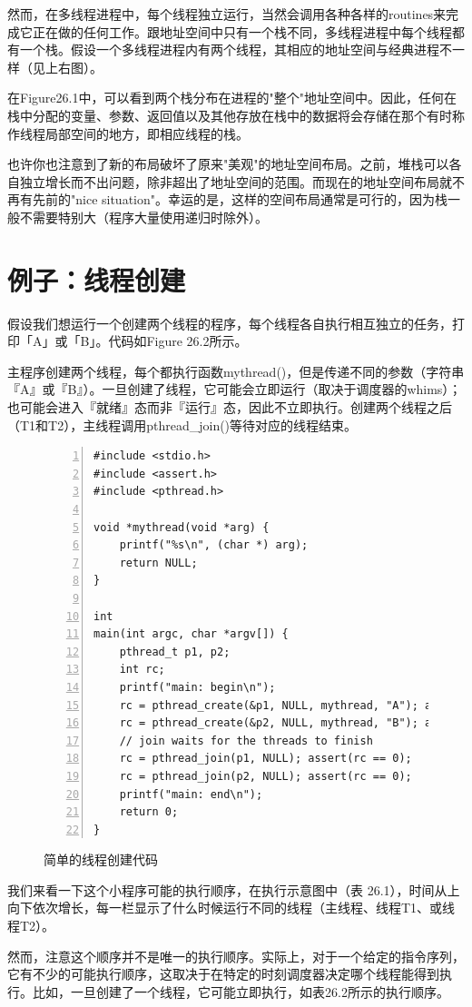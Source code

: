 然而，在多线程进程中，每个线程独立运行，当然会调用各种各样的routines来完成它正在做的任何工作。跟地址空间中只有一个栈不同，多线程进程中每个线程都有一个栈。假设一个多线程进程内有两个线程，其相应的地址空间与经典进程不一样（见上右图）。

在Figure26.1中，可以看到两个栈分布在进程的"整个"地址空间中。因此，任何在栈中分配的变量、参数、返回值以及其他存放在栈中的数据将会存储在那个有时称作线程局部空间的地方，即相应线程的栈。

也许你也注意到了新的布局破坏了原来"美观"的地址空间布局。之前，堆栈可以各自独立增长而不出问题，除非超出了地址空间的范围。而现在的地址空间布局就不再有先前的"nice situation"。幸运的是，这样的空间布局通常是可行的，因为栈一般不需要特别大（程序大量使用递归时除外）。

\section{例子：线程创建}
假设我们想运行一个创建两个线程的程序，每个线程各自执行相互独立的任务，打印「A」或「B」。代码如Figure 26.2所示。

主程序创建两个线程，每个都执行函数mythread()，但是传递不同的参数（字符串『A』或『B』）。一旦创建了线程，它可能会立即运行（取决于调度器的whims）；也可能会进入『就绪』态而非『运行』态，因此不立即执行。创建两个线程之后（T1和T2），主线程调用pthread\_join()等待对应的线程结束。
\begin{figure}[t]
\begin{lstlisting}[numbers=left,stepnumber=1,numberstyle=\footnotesize]
#include <stdio.h>
#include <assert.h>
#include <pthread.h>

void *mythread(void *arg) {
    printf("%s\n", (char *) arg);
    return NULL;
}

int
main(int argc, char *argv[]) {
    pthread_t p1, p2;
    int rc;
    printf("main: begin\n");
    rc = pthread_create(&p1, NULL, mythread, "A"); assert(rc == 0);
    rc = pthread_create(&p2, NULL, mythread, "B"); assert(rc == 0);
    // join waits for the threads to finish
    rc = pthread_join(p1, NULL); assert(rc == 0);
    rc = pthread_join(p2, NULL); assert(rc == 0);
    printf("main: end\n");
    return 0;
}
\end{lstlisting}
\caption{简单的线程创建代码}
\end{figure}

我们来看一下这个小程序可能的执行顺序，在执行示意图中（表 26.1），时间从上向下依次增长，每一栏显示了什么时候运行不同的线程（主线程、线程T1、或线程T2）。

然而，注意这个顺序并不是唯一的执行顺序。实际上，对于一个给定的指令序列，它有不少的可能执行顺序，这取决于在特定的时刻调度器决定哪个线程能得到执行。比如，一旦创建了一个线程，它可能立即执行，如表26.2所示的执行顺序。

